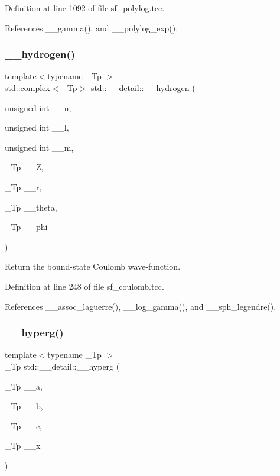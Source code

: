 Definition at line 1092 of file sf\+\_\+polylog.\+tcc.



References \+\_\+\+\_\+gamma(), and \+\_\+\+\_\+polylog\+\_\+exp().

\mbox{\label{namespacestd_1_1____detail_aba60bcf9f002dc900042065999546bc9}} 
\subsubsection{\texorpdfstring{\+\_\+\+\_\+hydrogen()}{\_\_hydrogen()}}
{\footnotesize\ttfamily template$<$typename \+\_\+\+Tp $>$ \\
std\+::complex$<$\+\_\+\+Tp$>$ std\+::\+\_\+\+\_\+detail\+::\+\_\+\+\_\+hydrogen (\begin{DoxyParamCaption}\item[{unsigned int}]{\+\_\+\+\_\+n,  }\item[{unsigned int}]{\+\_\+\+\_\+l,  }\item[{unsigned int}]{\+\_\+\+\_\+m,  }\item[{\+\_\+\+Tp}]{\+\_\+\+\_\+Z,  }\item[{\+\_\+\+Tp}]{\+\_\+\+\_\+r,  }\item[{\+\_\+\+Tp}]{\+\_\+\+\_\+theta,  }\item[{\+\_\+\+Tp}]{\+\_\+\+\_\+phi }\end{DoxyParamCaption})}

Return the bound-\/state Coulomb wave-\/function. 

Definition at line 248 of file sf\+\_\+coulomb.\+tcc.



References \+\_\+\+\_\+assoc\+\_\+laguerre(), \+\_\+\+\_\+log\+\_\+gamma(), and \+\_\+\+\_\+sph\+\_\+legendre().

\mbox{\label{namespacestd_1_1____detail_a316589a60d5e5f50201c2d42b980678c}} 
\subsubsection{\texorpdfstring{\+\_\+\+\_\+hyperg()}{\_\_hyperg()}}
{\footnotesize\ttfamily template$<$typename \+\_\+\+Tp $>$ \\
\+\_\+\+Tp std\+::\+\_\+\+\_\+detail\+::\+\_\+\+\_\+hyperg (\begin{DoxyParamCaption}\item[{\+\_\+\+Tp}]{\+\_\+\+\_\+a,  }\item[{\+\_\+\+Tp}]{\+\_\+\+\_\+b,  }\item[{\+\_\+\+Tp}]{\+\_\+\+\_\+c,  }\item[{\+\_\+\+Tp}]{\+\_\+\+\_\+x }\end{DoxyParamCaption})}



